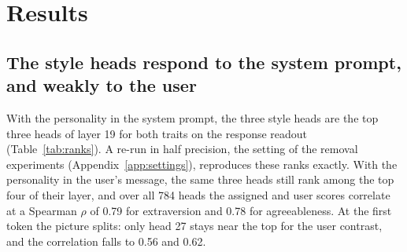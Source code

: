 \section{Results}
\label{sec:results}

\subsection{The style heads respond to the system prompt, and weakly to the user}
\label{sec:res-heads}

With the personality in the system prompt, the three style heads are the top three heads of layer 19 for both traits on the response readout (Table~\ref{tab:ranks}). A re-run in half precision, the setting of the removal experiments (Appendix~\ref{app:settings}), reproduces these ranks exactly. With the personality in the user's message, the same three heads still rank among the top four of their layer, and over all 784 heads the assigned and user scores correlate at a Spearman $\rho$ of 0.79 for extraversion and 0.78 for agreeableness. At the first token the picture splits: only head 27 stays near the top for the user contrast, and the correlation falls to 0.56 and 0.62.

